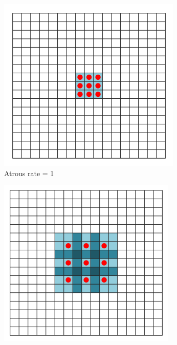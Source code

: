 	\begin{figure}[!htb]
		\begin{subfigure}{.3\textwidth}
			\centering
			\includegraphics[width=1.03\linewidth]{images/r_1}
			\caption{Atrous rate = 1}
		\end{subfigure}
		\begin{subfigure}{.3\textwidth}
			\centering
			\includegraphics[width=1\linewidth]{images/r_2}

\end{subfigure}
\end{figure}
